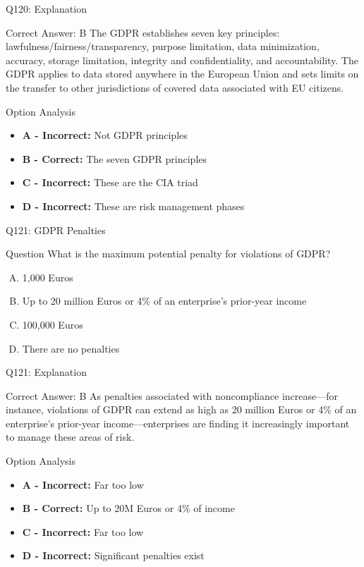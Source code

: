 \documentclass{beamer}
\begin{document}
	\begin{frame}{Q120: Explanation}
		\begin{block}{Correct Answer: B}
			The GDPR establishes seven key principles: lawfulness/fairness/transparency, purpose limitation, data minimization, accuracy, storage limitation, integrity and confidentiality, and accountability. The GDPR applies to data stored anywhere in the European Union and sets limits on the transfer to other jurisdictions of covered data associated with EU citizens.
		\end{block}
		\begin{block}{Option Analysis}
			\begin{itemize}
				\item \textbf{A - Incorrect:} Not GDPR principles
				\item \textbf{B - Correct:} The seven GDPR principles
				\item \textbf{C - Incorrect:} These are the CIA triad
				\item \textbf{D - Incorrect:} These are risk management phases
			\end{itemize}
		\end{block}
	\end{frame}
	
	\begin{frame}{Q121: GDPR Penalties}
		\begin{block}{Question}
			What is the maximum potential penalty for violations of GDPR?
		\end{block}
		\begin{enumerate}[(A)]
			\item 1,000 Euros
			\item Up to 20 million Euros or 4\% of an enterprise's prior-year income
			\item 100,000 Euros
			\item There are no penalties
		\end{enumerate}
	\end{frame}
	
	\begin{frame}{Q121: Explanation}
		\begin{block}{Correct Answer: B}
			As penalties associated with noncompliance increase—for instance, violations of GDPR can extend as high as 20 million Euros or 4\% of an enterprise's prior-year income—enterprises are finding it increasingly important to manage these areas of risk.
		\end{block}
		\begin{block}{Option Analysis}
			\begin{itemize}
				\item \textbf{A - Incorrect:} Far too low
				\item \textbf{B - Correct:} Up to 20M Euros or 4\% of income
				\item \textbf{C - Incorrect:} Far too low
				\item \textbf{D - Incorrect:} Significant penalties exist
			\end{itemize}
		\end{block}
	\end{frame}
	
\end{document}
